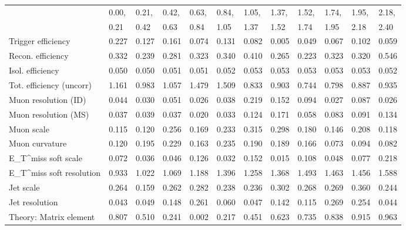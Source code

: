 \begin{tabular}{l|p{0.6cm}p{0.6cm}p{0.6cm}p{0.6cm}p{0.6cm}p{0.6cm}p{0.6cm}p{0.6cm}p{0.6cm}p{0.6cm}p{0.6cm}}
\hline
   & 0.00, & 0.21, & 0.42, & 0.63, & 0.84, & 1.05, & 1.37, & 1.52, & 1.74, & 1.95, & 2.18,  \\ 
   & 0.21 & 0.42 & 0.63 & 0.84 & 1.05 & 1.37 & 1.52 & 1.74 & 1.95 & 2.18 & 2.40  \\ 
\hline
Trigger efficiency                       & 0.227 & 0.127 & 0.161 & 0.074 & 0.131 & 0.082 & 0.005 & 0.049 & 0.067 & 0.102 & 0.059 \\
Recon. efficiency                        & 0.332 & 0.239 & 0.281 & 0.323 & 0.340 & 0.410 & 0.265 & 0.223 & 0.323 & 0.320 & 0.546 \\
Isol. efficiency                         & 0.050 & 0.050 & 0.051 & 0.051 & 0.052 & 0.053 & 0.053 & 0.053 & 0.053 & 0.053 & 0.052 \\
Tot. efficiency (uncorr)                 & 1.161 & 0.983 & 1.057 & 1.479 & 1.509 & 0.833 & 0.903 & 0.744 & 0.798 & 0.887 & 0.935 \\
Muon resolution (ID)                     & 0.044 & 0.030 & 0.051 & 0.026 & 0.038 & 0.219 & 0.152 & 0.094 & 0.027 & 0.087 & 0.026 \\
Muon resolution (MS)                     & 0.037 & 0.039 & 0.037 & 0.020 & 0.033 & 0.124 & 0.171 & 0.058 & 0.083 & 0.091 & 0.134 \\
Muon scale                               & 0.115 & 0.120 & 0.256 & 0.169 & 0.233 & 0.315 & 0.298 & 0.180 & 0.146 & 0.208 & 0.118 \\
Muon curvature                           & 0.120 & 0.195 & 0.229 & 0.163 & 0.235 & 0.190 & 0.189 & 0.166 & 0.073 & 0.094 & 0.082 \\
E_{T}^{miss} soft scale                  & 0.072 & 0.036 & 0.046 & 0.126 & 0.032 & 0.152 & 0.015 & 0.108 & 0.048 & 0.077 & 0.218 \\
E_{T}^{miss} soft resolution             & 0.933 & 1.022 & 1.069 & 1.188 & 1.396 & 1.258 & 1.368 & 1.493 & 1.463 & 1.456 & 1.588 \\
Jet scale                                & 0.264 & 0.159 & 0.262 & 0.282 & 0.238 & 0.236 & 0.302 & 0.268 & 0.269 & 0.360 & 0.244 \\
Jet resolution                           & 0.043 & 0.049 & 0.148 & 0.261 & 0.060 & 0.047 & 0.142 & 0.115 & 0.269 & 0.254 & 0.044 \\
Theory: Matrix element                   & 0.807 & 0.510 & 0.241 & 0.002 & 0.217 & 0.451 & 0.623 & 0.735 & 0.838 & 0.915 & 0.963 \\

\end{tabular}
